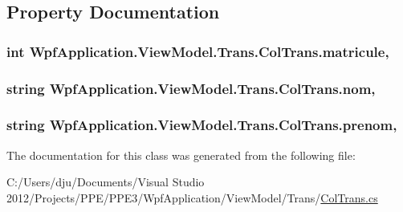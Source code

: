 \subsection{Property Documentation}
\hypertarget{class_wpf_application_1_1_view_model_1_1_trans_1_1_col_trans_a3fb492f9af2e8b2230ec81bf1ed225ee}{
\subsubsection[{matricule}]{\setlength{\rightskip}{0pt plus 5cm}int Wpf\-Application.\-View\-Model.\-Trans.\-Col\-Trans.\-matricule\hspace{0.3cm}{\ttfamily [get]}, {\ttfamily [set]}}}\label{class_wpf_application_1_1_view_model_1_1_trans_1_1_col_trans_a3fb492f9af2e8b2230ec81bf1ed225ee}
\hypertarget{class_wpf_application_1_1_view_model_1_1_trans_1_1_col_trans_a4a0175ae91e92eff8ab56141df9d745d}{
\subsubsection[{nom}]{\setlength{\rightskip}{0pt plus 5cm}string Wpf\-Application.\-View\-Model.\-Trans.\-Col\-Trans.\-nom\hspace{0.3cm}{\ttfamily [get]}, {\ttfamily [set]}}}\label{class_wpf_application_1_1_view_model_1_1_trans_1_1_col_trans_a4a0175ae91e92eff8ab56141df9d745d}
\hypertarget{class_wpf_application_1_1_view_model_1_1_trans_1_1_col_trans_a3a74c60e37c799adda7bb94e1f8015b0}{
\subsubsection[{prenom}]{\setlength{\rightskip}{0pt plus 5cm}string Wpf\-Application.\-View\-Model.\-Trans.\-Col\-Trans.\-prenom\hspace{0.3cm}{\ttfamily [get]}, {\ttfamily [set]}}}\label{class_wpf_application_1_1_view_model_1_1_trans_1_1_col_trans_a3a74c60e37c799adda7bb94e1f8015b0}


The documentation for this class was generated from the following file\-:\begin{DoxyCompactItemize}
\item 
C\-:/\-Users/dju/\-Documents/\-Visual Studio 2012/\-Projects/\-P\-P\-E/\-P\-P\-E3/\-Wpf\-Application/\-View\-Model/\-Trans/\hyperlink{_col_trans_8cs}{Col\-Trans.\-cs}\end{DoxyCompactItemize}
